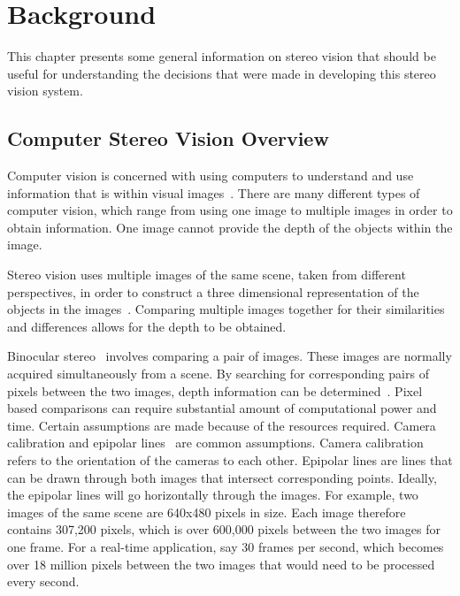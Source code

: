 \chapter{Background}
\label{bckgrnd}

This chapter presents some general information on stereo vision that should be useful for understanding the decisions that were made in developing this stereo vision system.

\section{Computer Stereo Vision Overview}

Computer vision is concerned with using computers to understand and use information that is within visual images~\cite{computerVision}. There are many different types of computer vision, which range from using one image to multiple images in order to obtain information. One image cannot provide the depth of the objects within the image.

Stereo vision uses multiple images of the same scene, taken from different perspectives, in order to construct a three dimensional representation of the objects in the images~\cite{stereoVision}. Comparing multiple images together for their similarities and differences allows for the depth to be obtained.

Binocular stereo~\cite{binocularStereo} involves comparing a pair of images. These images are normally acquired simultaneously from a scene. By searching for corresponding pairs of pixels between the two images, depth information can be determined~\cite{binocularStereo}. Pixel based comparisons can require substantial amount of computational power and time. Certain assumptions are made because of the resources required. Camera calibration and epipolar lines~\cite{binocularStereo} are common assumptions. Camera calibration refers to the orientation of the cameras to each other. Epipolar lines are lines that can be drawn through both images that intersect corresponding points. Ideally, the epipolar lines will go horizontally through the images. For example, two images of the same scene are 640x480 pixels in size. Each image therefore contains 307,200 pixels, which is over 600,000 pixels between the two images for one frame. For a real-time application, say 30 frames per second, which becomes over 18 million pixels between the two images that would need to be processed every second.

